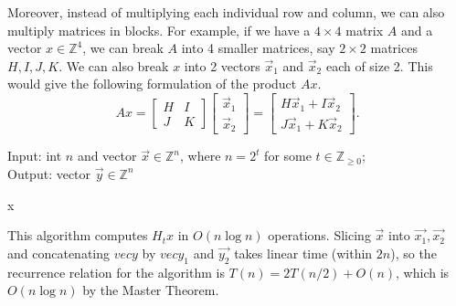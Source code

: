 \documentclass[11pt,addpoints]{exam}
\begin{document}
\begin{questions}
   Moreover, instead of multiplying each individual row and column, we can also multiply matrices in blocks. For example, if we have a $4\times 4$ matrix $A$ and a vector $x\in \mathbb{Z}^4$, we can break $A$ into 4 smaller matrices, say $2\times2$ matrices $H, I, J, K$. We can also break $x$ into 2 vectors $\vec{x}_1$ and $\vec{x}_2$ each of size 2. This would give the following formulation of the product $Ax$.
    \begin{equation*}
       A x = 
       \begin{bmatrix}
       H & I \\
       J & K
       \end{bmatrix}
       \begin{bmatrix}
       \vec{x}_1 \\
       \vec{x}_2
       \end{bmatrix}
       = 
       \begin{bmatrix}
       H\vec{x}_1 + I\vec{x}_2 \\
       J\vec{x}_1 + K\vec{x}_2
       \end{bmatrix}.
   \end{equation*}

\begin{solution}
\begin{algorithm}[H]
Input: int $n$ and vector $\vec{x} \in \mathbb{Z}^{n}$, where $n=2^t$ for some $t\in \mathbb{Z}_{\geq 0}$; \\
Output: vector $\vec{y}\in \mathbb{Z}^{n}$
      \begin{algorithmic}[1]
            \State \Return x
        \EndIf
        \EndFunction
      \end{algorithmic}
\end{algorithm}
This algorithm computes $H_t x$ in $O(n\log n)$ operations. Slicing $\vec x$ into $\vec{x_1}, \vec{x_2}$ and concatenating $vec{y}$ by $vec{y_1}$ and $\vec{y_2}$ takes linear time (within $2n$), so the recurrence relation for the algorithm is $T(n) = 2T(n/2) + O(n)$, which is $O(n\log n)$ by the Master Theorem.
\end{solution}


\end{questions}
\end{document}
